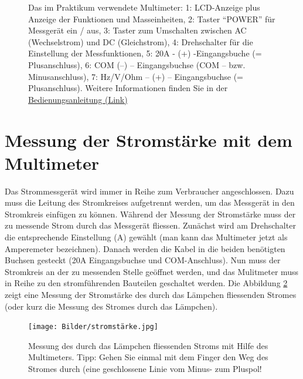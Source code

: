 \documentclass[11pt,twoside=false,open=any]{scrbook}
\begin{document}
\begin{figure}[h]
\caption{Das im Praktikum verwendete Multimeter: 1: LCD-Anzeige plus Anzeige der Funktionen und Masseinheiten, 2: Taster ``POWER'' für Messgerät ein / aus, 3: Taster zum Umschalten zwischen AC (Wechselstrom) und DC (Gleichstrom), 4: Drehschalter für die Einstellung der Messfunktionen, 5: 20A - (+) -Eingangsbuche  (= Plusanschluss), 6: COM (–) – Eingangsbuchse (COM – bzw. Minusanschluss), 7: Hz/V/Ohm – (+) – Eingangsbuchse (= Plusanschluss). Weitere Informationen finden Sie in der \href{https://drive.google.com/file/d/0B4nWIuz6_aEMR05PdVJFMjlaQWc/view?usp=sharing}{Bedienungsanleitung (Link)}}
\label{fig:bumerang}
\end{figure}

\section{Messung der Stromstärke mit dem Multimeter}
Das Strommessgerät wird immer in Reihe zum Verbraucher angeschlossen. Dazu muss die Leitung des Stromkreises aufgetrennt werden, um das Messgerät in den Stromkreis einfügen zu können. Während der Messung der Stromstärke muss der zu messende Strom durch das Messgerät fliessen. Zunächst wird am Drehschalter die entsprechende Einstellung (\si{\ampere}) gewählt (man kann das Multimeter jetzt als Amperemeter bezeichnen). Danach werden die Kabel in die beiden benötigten Buchsen gesteckt (20A Eingangsbuchse und COM-Anschluss). Nun muss der Stromkreis an der zu messenden Stelle geöffnet werden, und das Mulitmeter muss in Reihe zu den stromführenden Bauteilen geschaltet werden. Die Abbildung \ref{fig:stromstärke} zeigt eine Messung der Stromstärke des durch das Lämpchen fliessenden Stromes (oder kurz die Messung des Stromes durch das Lämpchen).

\begin{figure}[h]
\centering
\texttt{[image: Bilder/stromstärke.jpg]}
\caption{Messung des durch das Lämpchen fliessenden Stroms mit Hilfe des Multimeters. Tipp: Gehen Sie einmal mit dem Finger den Weg des Stromes durch (eine geschlossene Linie vom Minus- zum Pluspol!}
\label{fig:stromstärke}
\end{figure}
\end{document}
